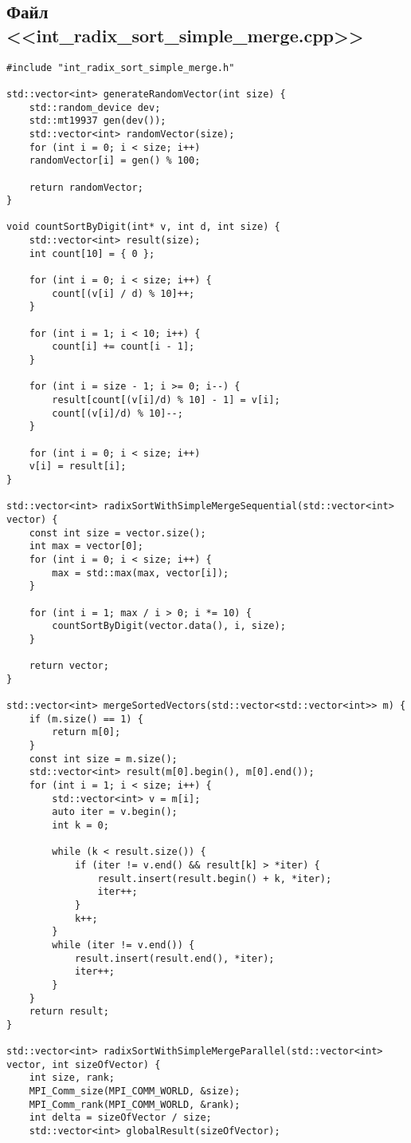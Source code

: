 \documentclass[a4paper, 14pt]{article}
\theoremstyle{plain}
\begin{document}
\newpage
\subsection*{\centering Файл <<int\_radix\_sort\_simple\_merge.cpp>>}
\begin{verbatim}
#include "int_radix_sort_simple_merge.h"

std::vector<int> generateRandomVector(int size) {
	std::random_device dev;
	std::mt19937 gen(dev());
	std::vector<int> randomVector(size);
	for (int i = 0; i < size; i++)
	randomVector[i] = gen() % 100;
	
	return randomVector;
}

void countSortByDigit(int* v, int d, int size) {
	std::vector<int> result(size);
	int count[10] = { 0 };
	
	for (int i = 0; i < size; i++) {
		count[(v[i] / d) % 10]++;
	}
	
	for (int i = 1; i < 10; i++) {
		count[i] += count[i - 1];
	}
	
	for (int i = size - 1; i >= 0; i--) {
		result[count[(v[i]/d) % 10] - 1] = v[i];
		count[(v[i]/d) % 10]--;
	}
	
	for (int i = 0; i < size; i++)
	v[i] = result[i];
}

std::vector<int> radixSortWithSimpleMergeSequential(std::vector<int> vector) {
	const int size = vector.size();
	int max = vector[0];
	for (int i = 0; i < size; i++) {
		max = std::max(max, vector[i]);
	}
	
	for (int i = 1; max / i > 0; i *= 10) {
		countSortByDigit(vector.data(), i, size);
	}
	
	return vector;
}

std::vector<int> mergeSortedVectors(std::vector<std::vector<int>> m) {
	if (m.size() == 1) {
		return m[0];
	}
	const int size = m.size();
	std::vector<int> result(m[0].begin(), m[0].end());
	for (int i = 1; i < size; i++) {
		std::vector<int> v = m[i];
		auto iter = v.begin();
		int k = 0;
		
		while (k < result.size()) {
			if (iter != v.end() && result[k] > *iter) {
				result.insert(result.begin() + k, *iter);
				iter++;
			}
			k++;
		}
		while (iter != v.end()) {
			result.insert(result.end(), *iter);
			iter++;
		}
	}
	return result;
}

std::vector<int> radixSortWithSimpleMergeParallel(std::vector<int> vector, int sizeOfVector) {
	int size, rank;
	MPI_Comm_size(MPI_COMM_WORLD, &size);
	MPI_Comm_rank(MPI_COMM_WORLD, &rank);
	int delta = sizeOfVector / size;
	std::vector<int> globalResult(sizeOfVector);
	

\end{verbatim}
\end{document}
